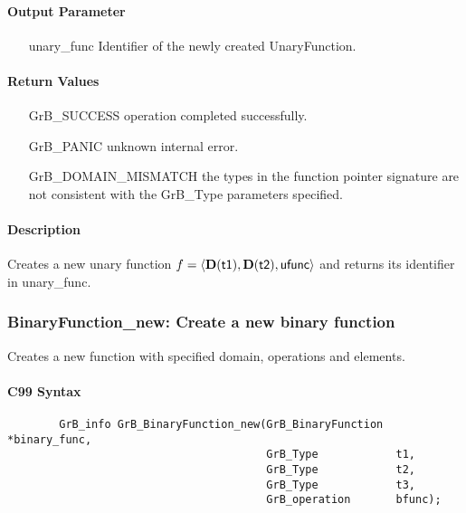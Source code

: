 \paragraph{Output Parameter}

\begin{itemize}[leftmargin=1.1in]
    \item[{\sf unary\_func}] Identifier of the newly created UnaryFunction.
\end{itemize}

\paragraph{Return Values}

\begin{itemize}[leftmargin=2.1in]
\item[{\sf GrB\_SUCCESS}]           operation completed successfully.
\item[{\sf GrB\_PANIC}]             unknown internal error.
\item[{\sf GrB\_DOMAIN\_MISMATCH}]  the types in the function pointer signature are not   
                                    consistent with the {\sf GrB\_Type} parameters specified.
\end{itemize}

\paragraph{Description}

Creates a new unary function $f = \langle \bold{D}({\sf t1}), \bold{D}({\sf t2}),
 {\sf ufunc} \rangle$ and returns its identifier in {\sf unary\_func}.


\subsubsection{{\sf BinaryFunction\_new}: Create a new binary function}

Creates a new function with specified domain, operations and elements.

\paragraph{C99 Syntax}

\begin{verbatim}
        GrB_info GrB_BinaryFunction_new(GrB_BinaryFunction *binary_func,
                                        GrB_Type            t1,
                                        GrB_Type            t2,
                                        GrB_Type            t3,
                                        GrB_operation       bfunc);
\end{verbatim}

